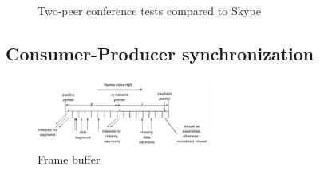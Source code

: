 \documentclass{icn/sig-alternate-2013} %
\begin{document}

%

\begin{figure}[t!]
\centering
\begin{scriptsize}
\def\svgwidth{0.53\textwidth}
\end{scriptsize}
\vspace{-18pt}
\caption{Two-peer conference tests compared to Skype}
\label{fig:tests-skype}
\end{figure}






\subsection{Consumer-Producer synchronization}

\begin{figure}[t!]
\centering
\includegraphics[width=0.5\textwidth]{buffer}
\caption{Frame buffer}
\label{fig:old-buf}
\end{figure}
\end{document}
